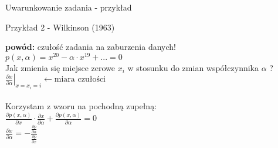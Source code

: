 \begin{frame}{Uwarunkowanie zadania - przykład}
	\begin{exampleblock}{Przykład 2 - Wilkinson (1963)}
    
    
        {\bf powód:} czułość zadania na zaburzenia danych! \\
        
        \centering
        \(
            p(x,\alpha) = x^{20} - \alpha \cdot x^{19} + ... = 0
        \) \\ \vspace{.1cm}
         Jak zmienia się miejsce zerowe $x_i$ w stosunku do zmian współczynnika $\alpha$ ?\\
         
        \(
            \left.
            \frac{ 
                \partial x
            }{
                \partial \alpha
            } 
            \right|_{x=x_i=i}
            \leftarrow \text{miara czułości}
        \) \\ \vspace{.1cm}\\
        
       
           Korzystam z wzoru na pochodną zupełną:\\
        \(
        	\frac{
            	\partial p(x,\alpha)
            }{
            	\partial x
            } \cdot \frac{
            	\partial x
            }{
            	\partial \alpha
            } + \frac{
            	\partial p(x, \alpha)
            }{
            	\partial \alpha
            } = 0
        \)\\
        
        \(
         \frac{
                  \partial x
              }{
                  \partial \alpha
              } = - \frac{
                  \frac{\partial p}{\partial \alpha}
              }{
                 \frac{\partial p}{\partial x}
              }
              \)
	\end{exampleblock}
\end{frame}
